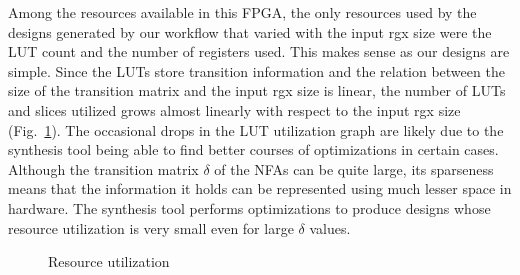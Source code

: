 Among the resources available in this \gls{FPGA}, the only resources
used by the designs generated by our workflow that varied with the
input \gls{rgx} size were the \gls{LUT} count and the number of
registers used.
%
This makes sense as our designs are simple.
Since the 
\glspl{LUT} store transition information and the relation between the
size of the transition matrix and the input \gls{rgx} size is linear,
the number of \glspl{LUT} and slices utilized grows almost linearly
with respect to the input \gls{rgx} size
(Fig.~\ref{graph:utilization}).
The occasional drops in the \gls{LUT} utilization graph are likely
due to the synthesis tool being able to find better courses of
optimizations in certain cases.
%
Although the transition matrix $\delta$ of the \glspl{NFA} can be
quite large, its sparseness means that the information it holds can be
represented using much lesser space in hardware.
%
The synthesis tool performs optimizations to produce designs whose
resource utilization is very small even for large $\delta$ values.

\begin{figure}
  \begin{center}
    
  \caption{Resource utilization}
  \label{graph:utilization}
  \end{center}
\end{figure}


